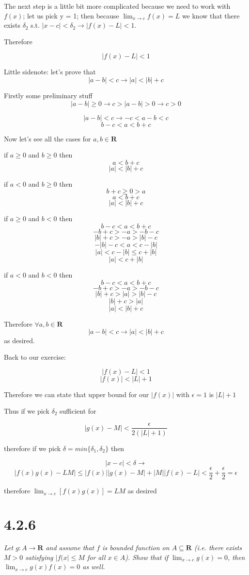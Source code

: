 \documentclass[11pt,oneside,titlepage]{book}
\begin{document}
The next step is a little bit more complicated because we need to work with $f(x)$; let us pick y = 1;
then because $\lim_{x \to c}f(x) = L$ we know that there exists $\delta_2$ s.t. $|x - c| < \delta_2
\to |f(x) - L| < 1$. 

Therefore

$$|f(x) - L| < 1$$

Little sidenote: let's prove that 
$$ |a - b| < c \to |a| < |b| + c  $$

Firstly some preliminary stuff
$$|a - b| \geq 0 \to c > |a - b| > 0 \to c > 0$$

$$|a - b| < c \to -c < a - b < c$$
$$b -c < a  < b + c$$

Now let's see all the cases for $a, b \in \textbf{R}$

if $a \geq 0$ and $b \geq 0$ then
$$a < b + c$$
$$|a| < |b| + c$$

if $a < 0$ and $b \geq 0$ then
$$ b + c \geq 0 > a$$
$$a < b + c$$
$$|a| < |b| + c$$

if $a \geq 0$ and $b < 0$ then
$$b -c < a  < b + c$$
$$-b +c > -a  > -b - c$$
$$|b| +c > -a  > |b| - c$$
$$-|b| - c  < a  <  c - |b|$$
$$|a|  <  c - |b| \leq c + |b|$$
$$|a|  <  c + |b|$$

if $a < 0$ and $b < 0$ then
$$b -c < a  < b + c$$
$$-b + c > -a  > -b - c$$
$$|b| + c > |a|  > |b| - c$$
$$|b| + c > |a|$$
$$|a| < |b| + c$$

Therefore $\forall a,b\in \textbf{R}$
$$|a - b| < c \to |a| < |b| + c$$
as desired.

Back to our exercise: 

$$|f(x) - L| < 1$$
$$|f(x)| < |L| + 1$$

Therefore we can state that upper bound for our $|f(x)|$ with $\epsilon = 1$ is $|L| + 1$

Thus if we pick $\delta_2$ sufficient for

$$|g(x) - M| < \frac{\epsilon}{2(|L| + 1)}$$

therefore if we pick $\delta = min\{\delta_1, \delta_2\}$ then

$$|x - c| < \delta \to $$
$$|f(x)g(x) - LM| \leq |f(x)||g(x) - M| + |M||f(x) - L| <  \frac{\epsilon}{2} +
\frac{\epsilon}{2} = \epsilon  $$

therefore $\lim_{x \to c}[f(x) g(x)] = LM$ as desired

\section*{4.2.6}
\textit{Let $g: A\to \textbf{R}$ and assume that $f$ is bounded function on $A \subseteq \textbf{R}$
  (i.e. there exists $M > 0$ satisfying $|f(x| \leq M$ for all $x \in A$). Show that
  if $\lim_{x \to c}g(x) = 0$, then $\lim_{x \to c}g(x)f(x) = 0$ as well.}
\end{document}
